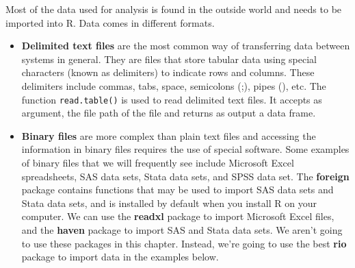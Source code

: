 \documentclass[
]{book}
\begin{document}
Most of the data used for analysis is found in the outside world and needs to be imported into R. Data comes in different formats.

\begin{itemize}
\item
  \textbf{Delimited text files} are the most common way of transferring data between systems in general. They are files that store tabular data using special characters (known as delimiters) to indicate rows and columns. These delimiters include commas, tabs, space, semicolons (;), pipes (\textbar), etc. The function \texttt{read.table()} is used to read delimited text files. It accepts as argument, the file path of the file and returns as output a data frame.
\item
  \textbf{Binary files} are more complex than plain text files and accessing the information in binary files requires the use of special software. Some examples of binary files that we will frequently see include Microsoft Excel spreadsheets, SAS data sets, Stata data sets, and SPSS data set. The \textbf{foreign} package contains functions that may be used to import SAS data sets and Stata data sets, and is installed by default when you install R on your computer. We can use the \textbf{readxl} package to import Microsoft Excel files, and the \textbf{haven} package to import SAS and Stata data sets. We aren't going to use these packages in this chapter. Instead, we're going to use the best \textbf{rio} package to import data in the examples below.
\end{itemize}
\end{document}
